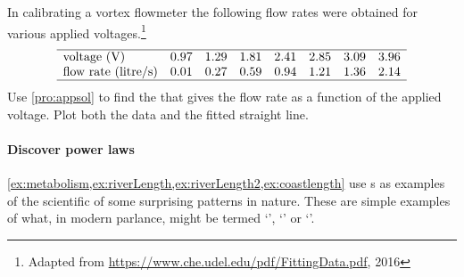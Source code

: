 \begin{reduce}
\begin{exercise}  
In calibrating a vortex flowmeter the following flow rates were obtained for various applied voltages.\footnote{Adapted from \url{https://www.che.udel.edu/pdf/FittingData.pdf}, 2016}
\setbox\ajrqrbox\hbox{}%
\marginajrbox%
\begin{equation*}
\begin{array}{lrrrrrrrr}\hline
\text{voltage (V)}&0.97&1.29&1.81&2.41&2.85&3.09&3.96\\
\text{flow rate (litre/s)}&0.01&0.27&0.59&0.94&1.21&1.36&2.14\\\hline
\end{array}
\end{equation*}
Use \autoref{pro:appsol} to find the  that gives the flow rate as a function of the applied voltage.
Plot both the data and the fitted straight line.
\end{exercise}
\end{reduce}





\paragraph{Discover power laws}
\cref{ex:metabolism,ex:riverLength,ex:riverLength2,ex:coastlength} use s as examples of the scientific  of some surprising patterns in nature.  
These are simple examples of what, in modern parlance, might be termed `', `' or `'.

